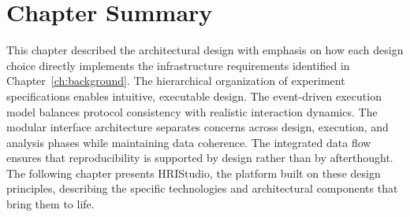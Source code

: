 \section{Chapter Summary}

This chapter described the architectural design with emphasis on how each design choice directly implements the infrastructure requirements identified in Chapter~\ref{ch:background}. The hierarchical organization of experiment specifications enables intuitive, executable design. The event-driven execution model balances protocol consistency with realistic interaction dynamics. The modular interface architecture separates concerns across design, execution, and analysis phases while maintaining data coherence. The integrated data flow ensures that reproducibility is supported by design rather than by afterthought. The following chapter presents HRIStudio, the platform built on these design principles, describing the specific technologies and architectural components that bring them to life.
